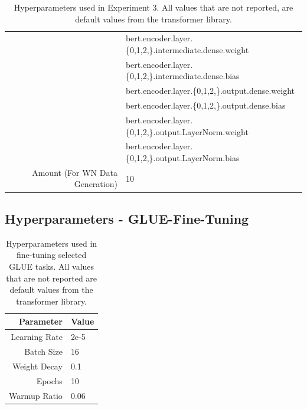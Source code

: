 \documentclass{article}
\begin{document}
\begin{table}[!h]
\begin{tabular}{r|l}
                      &      bert.encoder.layer.\{0,1,2,\}.intermediate.dense.weight \\
                      &      bert.encoder.layer.\{0,1,2,\}.intermediate.dense.bias \\
                      &      bert.encoder.layer.\{0,1,2,\}.output.dense.weight \\
                      &      bert.encoder.layer.\{0,1,2,\}.output.dense.bias \\
                      &      bert.encoder.layer.\{0,1,2,\}.output.LayerNorm.weight \\
                      &      bert.encoder.layer.\{0,1,2,\}.output.LayerNorm.bias \\
        Amount (For WN Data Generation)  & 10 \\
    \end{tabular}
    \caption{Hyperparameters used in Experiment 3. All values that are not reported, are default values from the transformer library.}
    \label{tab:hyp_exp3+}
\end{table}

\subsection{Hyperparameters - GLUE-Fine-Tuning}
\begin{table}[!h]
    \centering
    \begin{tabular}{r|l}
        Parameter & Value \\ \hline
        Learning Rate & 2e-5 \\
        Batch Size & 16 \\
        Weight Decay & 0.1 \\
        Epochs & 10 \\
        Warmup Ratio & 0.06 \\
    \end{tabular}
    \caption{Hyperparameters used in fine-tuning selected GLUE tasks. All values that are not reported are default values from the transformer library.}
    \label{tab:glue-ft}
\end{table}
\end{document}

